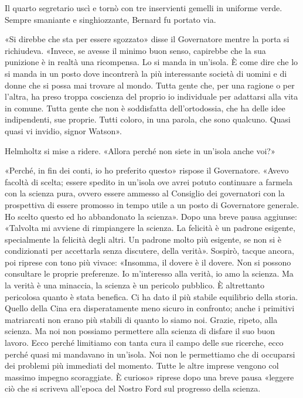 \documentclass[
a5paper, %
10pt, %
twoside, 
onecolumn, %
openany, %
]{memoir}
\begin{document}
Il quarto segretario uscì e tornò con tre inservienti gemelli in uniforme verde. Sempre smaniante e singhiozzante, Bernard fu portato via.

«Si direbbe che sta per essere sgozzato» disse il Governatore mentre la porta si richiudeva. «Invece, se avesse il minimo buon senso, capirebbe che la sua punizione è in realtà una ricompensa. Lo si manda in un’isola. È come dire che lo si manda in un posto dove incontrerà la più interessante società di uomini e di donne che si possa mai trovare al mondo. Tutta gente che, per una ragione o per l’altra, ha preso troppa coscienza del proprio io individuale per adattarsi alla vita in comune. Tutta gente che non è soddisfatta dell’ortodossia, che ha delle idee indipendenti, sue proprie. Tutti coloro, in una parola, che sono qualcuno. Quasi quasi vi invidio, signor Watson».

Helmholtz si mise a ridere. «Allora perché non siete in un’isola anche voi?»

«Perché, in fin dei conti, io ho preferito questo» rispose il Governatore. «Avevo facoltà di scelta; essere spedito in un’isola ove avrei potuto continuare a farmela con la scienza pura, ovvero essere ammesso al Consiglio dei governatori con la prospettiva di essere promosso in tempo utile a un posto di Governatore generale. Ho scelto questo ed ho abbandonato la scienza». Dopo una breve pausa aggiunse: «Talvolta mi avviene di rimpiangere la scienza. La felicità è un padrone esigente, specialmente la felicità degli altri. Un padrone molto più esigente, se non si è condizionati per accettarla senza discutere, della verità». Sospirò, tacque ancora, poi riprese con tono più vivace: «Insomma, il dovere è il dovere. Non si possono consultare le proprie preferenze. Io m’interesso alla verità, io amo la scienza. Ma la verità è una minaccia, la scienza è un pericolo pubblico. È altrettanto pericolosa quanto è stata benefica. Ci ha dato il più stabile equilibrio della storia. Quello della Cina era disperatamente meno sicuro in confronto; anche i primitivi matriarcati non erano più stabili di quanto lo siamo noi. Grazie, ripeto, alla scienza. Ma noi non possiamo permettere alla scienza di disfare il suo buon lavoro. Ecco perché limitiamo con tanta cura il campo delle sue ricerche, ecco perché quasi mi mandavano in un’isola. Noi non le permettiamo che di occuparsi dei problemi più immediati del momento. Tutte le altre imprese vengono col massimo impegno scoraggiate. È curioso» riprese dopo una breve pausa «leggere ciò che si scriveva all’epoca del Nostro Ford sul progresso della scienza.
\end{document}
